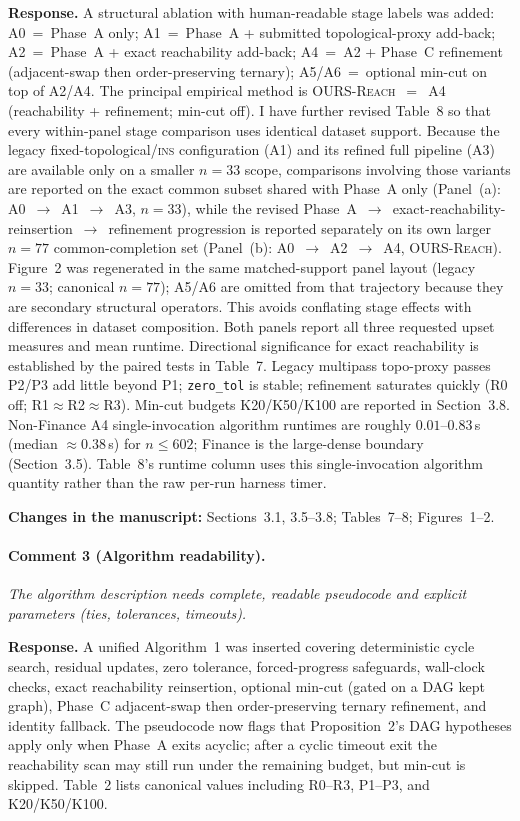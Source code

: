 \documentclass[11pt]{article}
\newcommand{\commentbox}[1]{\par\textit{#1}\par\medskip}
\newcommand{\changes}[1]{\textbf{Changes in the manuscript:} #1\par\medskip}
\begin{document}
\noindent\textbf{Response.}
A structural ablation with human-readable stage labels was added:
A0~=~Phase~A only; A1~=~Phase~A + submitted topological-proxy add-back; A2~=~Phase~A + exact reachability add-back; A4~=~A2 + Phase~C refinement (adjacent-swap then order-preserving ternary); A5/A6~=~optional min-cut on top of A2/A4.
The principal empirical method is \textsc{OURS-Reach}~$=$~A4 (reachability + refinement; min-cut off).
I have further revised Table~8 so that every within-panel stage comparison uses identical dataset support. Because the legacy fixed-topological/\textsc{ins} configuration (A1) and its refined full pipeline (A3) are available only on a smaller $n=33$ scope, comparisons involving those variants are reported on the exact common subset shared with Phase~A only (Panel~(a): A0~$\to$~A1~$\to$~A3, $n=33$), while the revised Phase~A~$\to$~exact-reachability-reinsertion~$\to$~refinement progression is reported separately on its own larger $n=77$ common-completion set (Panel~(b): A0~$\to$~A2~$\to$~A4, \textsc{OURS-Reach}). Figure~2 was regenerated in the same matched-support panel layout (legacy $n=33$; canonical $n=77$); A5/A6 are omitted from that trajectory because they are secondary structural operators. This avoids conflating stage effects with differences in dataset composition. Both panels report all three requested upset measures and mean runtime. Directional significance for exact reachability is established by the paired tests in Table~7. Legacy multipass topo-proxy passes P2/P3 add little beyond P1; \texttt{zero\_tol} is stable; refinement saturates quickly (R0 off; R1$\approx$R2$\approx$R3). Min-cut budgets K20/K50/K100 are reported in Section~3.8. Non-Finance A4 single-invocation algorithm runtimes are roughly $0.01$--$0.83$\,s (median $\approx 0.38$\,s) for $n\le 602$; Finance is the large-dense boundary (Section~3.5). Table~8's runtime column uses this single-invocation algorithm quantity rather than the raw per-run harness timer.

\changes{Sections~3.1, 3.5--3.8; Tables~7--8; Figures~1--2.}

\paragraph{Comment 3 (Algorithm readability).}
\commentbox{The algorithm description needs complete, readable pseudocode and explicit parameters (ties, tolerances, timeouts).}

\noindent\textbf{Response.}
A unified Algorithm~1 was inserted covering deterministic cycle search, residual updates, zero tolerance, forced-progress safeguards, wall-clock checks, exact reachability reinsertion, optional min-cut (gated on a DAG kept graph), Phase~C adjacent-swap then order-preserving ternary refinement, and identity fallback. The pseudocode now flags that Proposition~2's DAG hypotheses apply only when Phase~A exits acyclic; after a cyclic timeout exit the reachability scan may still run under the remaining budget, but min-cut is skipped. Table~2 lists canonical values including R0--R3, P1--P3, and K20/K50/K100.
\end{document}
